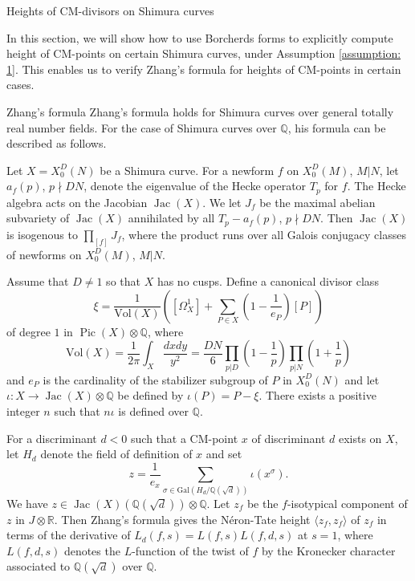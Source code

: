 \documentclass{amsart}
\theoremstyle{definition}
\def\Q{\mathbb Q}
\def\R{\mathbb R}
\def\gen#1{\langle #1\rangle}
\def\Pic{\operatorname{Pic}}
\def\Jac{\operatorname{Jac}}
\begin{document}
\begin{section}{Heights of CM-divisors on Shimura curves}
\label{section: height}

In this section, we will show how to use Borcherds forms to
explicitly compute height of CM-points on certain Shimura curves,
under Assumption \ref{assumption: 1}. This enables us
to verify Zhang's formula \cite{Zhang} for heights of CM-points in certain
cases.

\begin{subsection}{Zhang's formula}
Zhang's formula \cite{Zhang} holds for Shimura curves over general
totally real number fields. For the case of Shimura curves over $\Q$,
his formula can be described as follows.

Let $X=X_0^D(N)$ be a Shimura curve. For a newform $f$ on
$X_0^D(M)$, $M|N$, let $a_f(p)$, $p\nmid DN$, denote the eigenvalue
of the Hecke operator $T_p$ for $f$. The Hecke algebra acts on the
Jacobian $\Jac(X)$. We let $J_f$ be the maximal abelian subvariety
of $\Jac(X)$ annihilated by all $T_p-a_f(p)$, $p\nmid DN$. Then
$\Jac(X)$ is isogenous to $\prod_{[f]}J_f$, where the product
runs over all Galois conjugacy classes of newforms on $X_0^D(M)$,
$M|N$.

Assume that $D\neq 1$ so that $X$ has no cusps. Define a canonical
divisor class
\begin{equation} \label{equation: canonical divisor}
  \xi=\frac1{\mathrm{Vol}(X)}\left(
  [\Omega_X^1]+\sum_{P\in X}\left(1-\frac1{e_P}\right)[P]\right)
\end{equation}
of degree $1$ in $\Pic(X)\otimes\Q$, where
$$
  \mathrm{Vol}(X)=\frac1{2\pi}\int_X\frac{dxdy}{y^2}
 =\frac{DN}6\prod_{p|D}\left(1-\frac1p\right)
  \prod_{p|N}\left(1+\frac1p\right)
$$
and $e_P$ is the cardinality of the stabilizer subgroup of $P$ in
$X_0^D(N)$ and let $\iota:X\to\Jac(X)\otimes\Q$ be defined by
$\iota(P)=P-\xi$. There exists a positive integer $n$ such that
$n\iota$ is defined over $\Q$.

For a discriminant $d<0$ such that a CM-point $x$ of
discriminant $d$ exists on $X$, let $H_d$ denote the field of
definition of $x$ and set
\begin{equation} \label{equation: CM divisor}
  z=\frac1{e_x}\sum_{\sigma\in\mathrm{Gal}(H_d/\Q(\sqrt d))}\iota(x^\sigma).
\end{equation}
We have $z\in\Jac(X)(\Q(\sqrt d))\otimes\Q$. Let $z_f$ be the
$f$-isotypical component of $z$ in $J\otimes\R$. Then Zhang's formula
gives the N\'eron-Tate height $\gen{z_f,z_f}$ of $z_f$ in terms of the
derivative of $L_d(f,s)=L(f,s)L(f,d,s)$ at $s=1$, where $L(f,d,s)$
denotes the $L$-function of the twist of $f$ by the Kronecker
character associated to $\Q(\sqrt d)$ over $\Q$.


\end{subsection}
\end{section}
\end{document}
